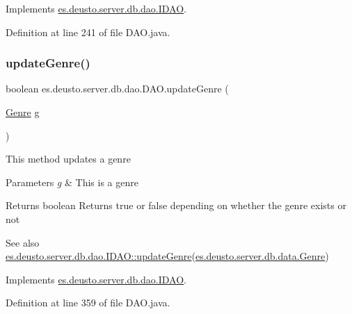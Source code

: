 Implements \hyperlink{interfacees_1_1deusto_1_1server_1_1db_1_1dao_1_1_i_d_a_o_a3a3ca0456879e35349a937aac661ff3f}{es.\+deusto.\+server.\+db.\+dao.\+I\+D\+AO}.



Definition at line 241 of file D\+A\+O.\+java.

\mbox{\label{classes_1_1deusto_1_1server_1_1db_1_1dao_1_1_d_a_o_ae08384fb32fa6936c93f6292dbe02c7e}} 
\subsubsection{\texorpdfstring{update\+Genre()}{updateGenre()}}
{\footnotesize\ttfamily boolean es.\+deusto.\+server.\+db.\+dao.\+D\+A\+O.\+update\+Genre (\begin{DoxyParamCaption}\item[{\hyperlink{classes_1_1deusto_1_1server_1_1db_1_1data_1_1_genre}{Genre}}]{g }\end{DoxyParamCaption})}

This method updates a genre 
\begin{DoxyParams}{Parameters}
{\em g} & This is a genre \\
\hline
\end{DoxyParams}
\begin{DoxyReturn}{Returns}
boolean Returns true or false depending on whether the genre exists or not 
\end{DoxyReturn}
\begin{DoxySeeAlso}{See also}
\hyperlink{interfacees_1_1deusto_1_1server_1_1db_1_1dao_1_1_i_d_a_o_ae989ff2681d6afe8651a595340265c39}{es.\+deusto.\+server.\+db.\+dao.\+I\+D\+A\+O\+::update\+Genre}(\hyperlink{classes_1_1deusto_1_1server_1_1db_1_1data_1_1_genre}{es.\+deusto.\+server.\+db.\+data.\+Genre}) 
\end{DoxySeeAlso}


Implements \hyperlink{interfacees_1_1deusto_1_1server_1_1db_1_1dao_1_1_i_d_a_o_ae989ff2681d6afe8651a595340265c39}{es.\+deusto.\+server.\+db.\+dao.\+I\+D\+AO}.



Definition at line 359 of file D\+A\+O.\+java.

